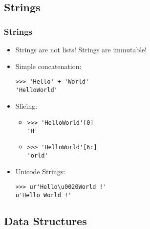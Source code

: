 \documentclass{beamer}
\begin{document}
\subsection{Strings}
\begin{frame}[fragile]
\frametitle{Strings}
\begin{itemize}
\item<1-> Strings are not lists! Strings are immutable!
\item<2-> Simple concatenation: 
\begin{verbatim}
>>> 'Hello' + 'World'
'HelloWorld'
\end{verbatim}
\item<3-> Slicing:
\begin{itemize}
\item<4->\begin{verbatim}
>>> 'HelloWorld'[0]
'H'
\end{verbatim}
\item<5->\begin{verbatim}
>>> 'HelloWorld'[6:]
'orld'
\end{verbatim}
\end{itemize}
\item<6-> Unicode Strings:
\begin{verbatim}
>>> ur'Hello\u0020World !'
u'Hello World !'
\end{verbatim}
\end{itemize}
\end{frame}

\subsection{Data Structures}
\end{document}

